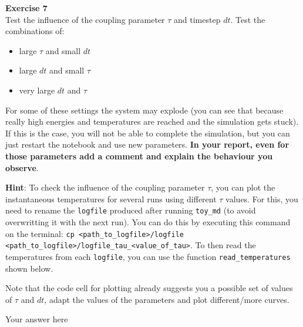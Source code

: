 \documentclass{article}
\begin{document}
\begin{mdframed}
\textbf{Exercise 7}\\
Test the influence of the coupling parameter $\tau$ and timestep $dt$.
Test the combinations of:

\begin{itemize}
\item large $\tau$ and small $dt$
\item large $dt$ and small $\tau$
\item very large $dt$ and $\tau$
\end{itemize}

For some of these settings the system may explode (you can see that because really high energies and temperatures are reached and the simulation gets stuck). If this is the case, you will not be able to complete the simulation, but you can just restart the notebook and use new parameters. \textbf{In your report, even for those parameters add a comment and explain the behaviour you observe}.

\textbf{Hint}: To check the influence of the coupling parameter $\tau$, you can plot the instantaneous temperatures for several runs using different $\tau$ values.\newline
For this, you need to rename the \texttt{logfile} produced after running \texttt{toy\_md} (to avoid overwritting it with the next run). You can do this by executing this command on the terminal: \texttt{cp \textless path\_to\_logfile\textgreater /logfile \textless path\_to\_logfile\textgreater /logfile\_tau\_\textless value\_of\_tau\textgreater }. To then read the temperatures from each \texttt{logfile}, you can use the function \texttt{read\_temperatures} shown below.

Note that the code cell for plotting already suggests you a possible set of values of $\tau$ and $dt$, adapt the values of the parameters and plot different/more curves.
\end{mdframed}

Your answer here

\end{document}
